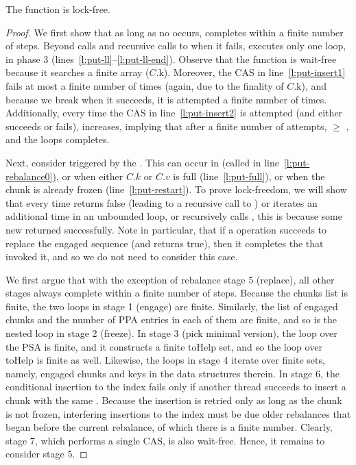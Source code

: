 \begin{lemma}
The   function is lock-free.
\end{lemma}
\begin{proof}
We first show that as long as no  occurs,  completes within a finite number of steps. 
Beyond  calls and recursive calls to  when it fails,  executes 
only one loop, in phase 3 (lines~\ref{l:put-ll}--\ref{l:put-ll-end}).  
Observe that the  function is wait-free because it searches a finite array ($C$.k).
Moreover, the CAS in line~\ref{l:put-insert1} fails at most a finite number of times (again, due to the finality of  $C$.k),
and because we break when it succeeds, it is attempted a finite number of times. 
Additionally, every time the CAS in line~\ref{l:put-insert2} is attempted (and either succeeds or fails),    increases,
implying that after a finite number of attempts, { $ \geq$ }, and the loops completes. 

Next, consider  triggered by the . This can occur in  (called in line~\ref{l:put-rebalance0}), 
or when either $C.k$ or $C.v$ is full (line~\ref{l:put-full}), or when the chunk is already frozen (line~\ref{l:put-restart}). 
To prove lock-freedom, 
we will show that every time  returns false (leading to a recursive call to ) or iterates  
an additional time in an unbounded loop, or recursively calls , this is because some new   returned successfully. 
Note in particular, that if a   operation succeeds to replace the engaged sequence (and returns true), then it 
completes the  that invoked it, and so we do not need to consider this case.

We first argue that with the exception of rebalance stage 5 (replace), all other   stages  always complete within a finite number of steps. 
Because the chunks list is finite, the two loops in stage 1 (engage) are finite. 
Similarly, the list of engaged chunks and the number of PPA entries in each of them are finite, and so is the nested loop in stage 2 (freeze). 
In stage 3 (pick minimal version), the loop over the PSA is finite, and it constructs a finite toHelp set, and so the loop over toHelp is finite as well.
Likewise, the loops in stage 4 iterate over finite sets, namely, engaged chunks and keys in the data structures therein.  
In stage 6, the conditional insertion to the index fails only if another thread succeeds to insert a chunk with the same . 
Because the insertion is retried only as long as the chunk is not frozen, interfering insertions to the index must be due older rebalances that began before 
the current rebalance, of which there is  a finite number.
Clearly, stage 7, which performs a single CAS, is also wait-free. 
Hence, it remains to consider stage 5.   


\end{proof}
